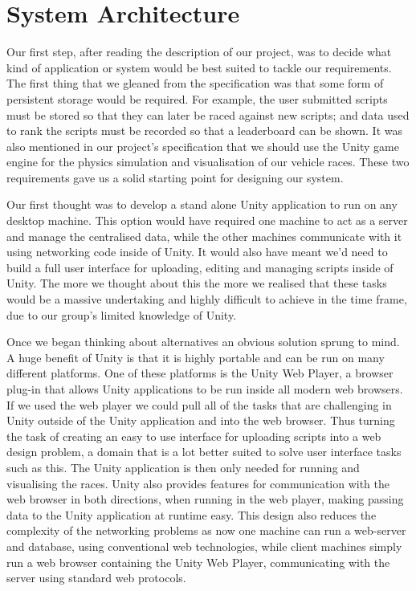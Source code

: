 \section{System Architecture}

Our first step, after reading the description of our project, was to decide what kind of application or system would be best suited to tackle our requirements. The first thing that we gleaned from the specification was that some form of persistent storage would be required. For example, the user submitted scripts must be stored so that they can later be raced against new scripts; and data used to rank the scripts must be recorded so that a leaderboard can be shown. It was also mentioned in our project's specification that we should use the Unity game engine for the physics simulation and visualisation of our vehicle races. These two requirements gave us a solid starting point for designing our system. 

Our first thought was to develop a stand alone Unity application to run on any desktop machine. This option would have required one machine to act as a server and manage the centralised data, while the other machines communicate with it using networking code inside of Unity. It would also have meant we'd need to build a full user interface for uploading, editing and managing scripts inside of Unity. The more we thought about this the more we realised that these tasks would be a massive undertaking and highly difficult to achieve in the time frame, due to our group's limited knowledge of Unity.

Once we began thinking about alternatives an obvious solution sprung to mind. A huge benefit of Unity is that it is highly portable and can be run on many different platforms. One of these platforms is the Unity Web Player, a browser plug-in that allows Unity applications to be run inside all modern web browsers. If we used the web player we could pull all of the tasks that are challenging in Unity outside of the Unity application and into the web browser. Thus turning the task of creating an easy to use interface for uploading scripts into a web design problem, a domain that is a lot better suited to solve user interface tasks such as this. The Unity application is then only needed for running and visualising the races. Unity also provides features for communication with the web browser in both directions, when running in the web player, making passing data to the Unity application at runtime easy. This design also reduces the complexity of the networking problems as now one machine can run a web-server and database, using conventional web technologies, while client machines simply run a web browser containing the Unity Web Player, communicating with the server using standard web protocols.

